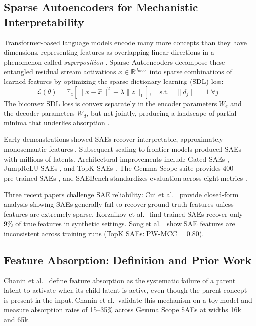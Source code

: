 \documentclass{article}
\begin{document}
\subsection{Sparse Autoencoders for Mechanistic Interpretability}

Transformer-based language models encode many more concepts than they have dimensions, representing features as overlapping linear directions in a phenomenon called \textit{superposition} \cite{elhage2022toy}. Sparse Autoencoders decompose these entangled residual stream activations $x \in \mathbb{R}^{d_{\text{model}}}$ into sparse combinations of learned features by optimizing the sparse dictionary learning (SDL) loss:
\begin{equation}
\mathcal{L}(\theta) = \mathbb{E}_x \left[\|x - \hat{x}\|^2 + \lambda \|z\|_1\right], \quad \text{s.t.} \quad \|d_j\| = 1 \; \forall j.
\tag{1}
\end{equation}
The biconvex SDL loss is convex separately in the encoder parameters $W_e$ and the decoder parameters $W_d$, but not jointly, producing a landscape of partial minima that underlies absorption \cite{tang2025unified}.

Early demonstrations showed SAEs recover interpretable, approximately monosemantic features \cite{bricken2023monosemanticity}. Subsequent scaling to frontier models \cite{templeton2024scaling,gao2024scaling} produced SAEs with millions of latents. Architectural improvements include Gated SAEs \cite{rajamanoharan2024gated}, JumpReLU SAEs \cite{rajamanoharan2024jumprelu}, and TopK SAEs \cite{gao2024scaling}. The Gemma Scope suite provides 400+ pre-trained SAEs \cite{lieberum2024gemma}, and SAEBench standardizes evaluation across eight metrics \cite{karvonen2025saebench}.

Three recent papers challenge SAE reliability: Cui et al.\ \cite{cui2025limits} provide closed-form analysis showing SAEs generally fail to recover ground-truth features unless features are extremely sparse. Korznikov et al.\ \cite{korznikov2026sanity} find trained SAEs recover only 9\% of true features in synthetic settings. Song et al.\ \cite{song2025consistency} show SAE features are inconsistent across training runs (TopK SAEs: PW-MCC = 0.80).

\subsection{Feature Absorption: Definition and Prior Work}

Chanin et al.\ \cite{chanin2024absorption} define feature absorption as the systematic failure of a parent latent to activate when its child latent is active, even though the parent concept is present in the input. Chanin et al.\ validate this mechanism on a toy model and measure absorption rates of 15--35\% across Gemma Scope SAEs at widths 16k and 65k.
\end{document}
